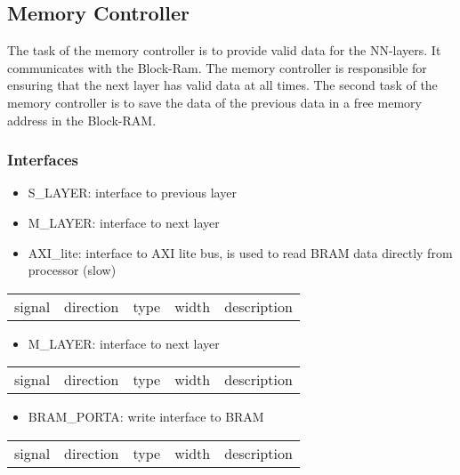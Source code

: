 \subsection{Memory Controller}
The task of the memory controller is to provide valid data for the NN-layers. It communicates with the Block-Ram. The memory controller is responsible for ensuring that the next layer has valid data at all times. The second task of the memory controller is to save the data of the previous data in a free memory address in the Block-RAM. 

\subsubsection{Interfaces}
\begin{itemize}
	\item S\_LAYER: interface to previous layer
	\item M\_LAYER: interface to next layer 
	\item AXI\_lite: interface to AXI lite bus, is used to read BRAM data directly from processor (slow)
\end{itemize}
\begin{tabular}{|l|l|l|l|l|}
	
	signal & direction & type & width & description\\
	
\end{tabular}

\begin{itemize}
	\item M\_LAYER: interface to next layer
\end{itemize}
\begin{tabular}{|l|l|l|l|l|}
	
	signal & direction & type & width & description\\
	
\end{tabular}

\begin{itemize}
	\item BRAM\_PORTA: write interface to BRAM
\end{itemize}
\begin{tabular}{|l|l|l|l|l|}
	
	signal & direction & type & width & description\\
	
\end{tabular}

